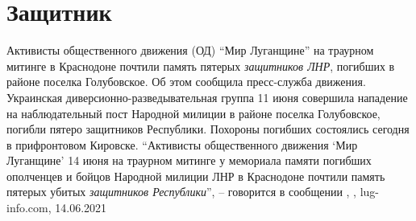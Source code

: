  
 
 
 
 
\chapter{Защитник}
\label{sec:slova.zaschitnik}

Активисты общественного движения (ОД) \enquote{Мир Луганщине} на траурном
митинге в Краснодоне почтили память пятерых \emph{защитников ЛНР}, погибших в
районе поселка Голубовское. Об этом сообщила пресс-служба движения.  Украинская
диверсионно-разведывательная группа 11 июня совершила нападение на
наблюдательный пост Народной милиции в районе поселка Голубовское, погибли
пятеро защитников Республики. Похороны погибших состоялись сегодня в
прифронтовом Кировске.  \enquote{Активисты общественного движения \enquote{Мир
Луганщине} 14 июня на траурном митинге у мемориала памяти погибших ополченцев и
бойцов Народной милиции ЛНР в Краснодоне почтили память пятерых убитых
\emph{защитников Республики}}, – говорится в сообщении
, , lug-info.com,
14.06.2021


